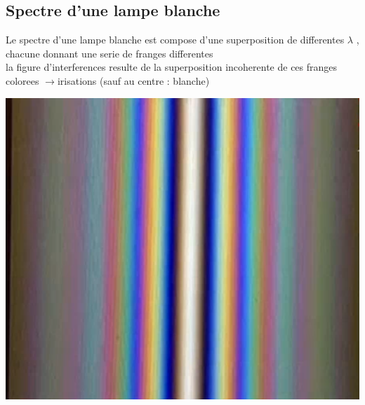 \documentclass[12pt]{book}
\begin{document}
            \subsection{Spectre d'une lampe blanche}
                \begin{minipage}{0.49\linewidth}
                    Le spectre d'une lampe blanche est compose d'une superposition de differentes $\lambda$ , chacune donnant une serie de franges differentes \\
                    la figure d'interferences resulte de la superposition incoherente de ces franges colorees $\to $irisations (sauf au centre : blanche)
                \end{minipage}
                \begin{minipage}{0.49\linewidth}
                    \includegraphics[width=\linewidth]{pic/spectreblanch.png}
                \end{minipage}
\end{document}
